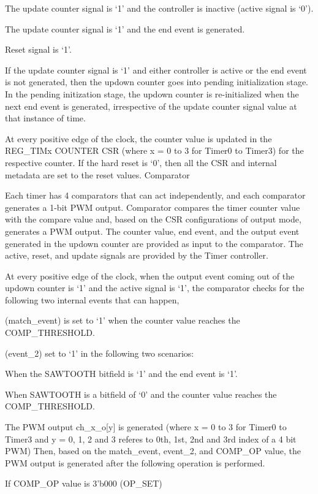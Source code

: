     The update counter signal is ‘1’ and the controller is inactive (active signal is ‘0’).

    The update counter signal is ‘1’ and the end event is generated.

    Reset signal is ‘1’.

If the update counter signal is ‘1’ and either controller is active or the end event is not generated, then the updown counter goes into pending initialization stage. In the pending initization stage, the updown counter is re-initialized when the next end event is generated, irrespective of the update counter signal value at that instance of time.

At every positive edge of the clock, the counter value is updated in the REG_TIMx COUNTER CSR (where x = 0 to 3 for Timer0 to Timer3) for the respective counter. If the hard reset is ‘0’, then all the CSR and internal metadata are set to the reset values.
Comparator

Each timer has 4 comparators that can act independently, and each comparator generates a 1-bit PWM output. Comparator compares the timer counter value with the compare value and, based on the CSR configurations of output mode, generates a PWM output. The counter value, end event, and the output event generated in the updown counter are provided as input to the comparator. The active, reset, and update signals are provided by the Timer controller.

At every positive edge of the clock, when the output event coming out of the updown counter is ‘1’ and the active signal is ‘1’, the comparator checks for the following two internal events that can happen,

    (match_event) is set to ‘1’ when the counter value reaches the COMP_THRESHOLD.

    (event_2) set to ‘1’ in the following two scenarios:

        When the SAWTOOTH bitfield is ‘1’ and the end event is ‘1’.

        When SAWTOOTH is a bitfield of ‘0’ and the counter value reaches the COMP_THRESHOLD.

The PWM output ch_x_o[y] is generated (where x = 0 to 3 for Timer0 to Timer3 and y = 0, 1, 2 and 3 referes to 0th, 1st, 2nd and 3rd index of a 4 bit PWM) Then, based on the match_event, event_2, and COMP_OP value, the PWM output is generated after the following operation is performed.

    If COMP_OP value is 3’b000 (OP_SET)

